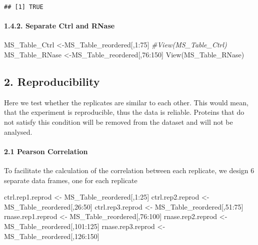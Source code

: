 \documentclass[
]{article}
\newenvironment{Shaded}{\begin{snugshade}}{\end{snugshade}}
\newcommand{\CommentTok}[1]{\textcolor[rgb]{0.56,0.35,0.01}{\textit{#1}}}
\newcommand{\DecValTok}[1]{\textcolor[rgb]{0.00,0.00,0.81}{#1}}
\newcommand{\FunctionTok}[1]{\textcolor[rgb]{0.00,0.00,0.00}{#1}}
\newcommand{\NormalTok}[1]{#1}
\newcommand{\OtherTok}[1]{\textcolor[rgb]{0.56,0.35,0.01}{#1}}
\newcommand{\SpecialCharTok}[1]{\textcolor[rgb]{0.00,0.00,0.00}{#1}}
\begin{document}
\begin{verbatim}
## [1] TRUE
\end{verbatim}

\hypertarget{separate-ctrl-and-rnase}{%
\paragraph{1.4.2. Separate Ctrl and
RNase}\label{separate-ctrl-and-rnase}}

\begin{Shaded}
\begin{Highlighting}[]
\NormalTok{MS\_Table\_Ctrl }\OtherTok{\textless{}{-}}\NormalTok{MS\_Table\_reordered[,}\DecValTok{1}\SpecialCharTok{:}\DecValTok{75}\NormalTok{]}
\CommentTok{\#View(MS\_Table\_Ctrl)}
\NormalTok{MS\_Table\_RNase }\OtherTok{\textless{}{-}}\NormalTok{MS\_Table\_reordered[,}\DecValTok{76}\SpecialCharTok{:}\DecValTok{150}\NormalTok{]}
\FunctionTok{View}\NormalTok{(MS\_Table\_RNase)}
\end{Highlighting}
\end{Shaded}

\hypertarget{reproducibility}{%
\subsection{2. Reproducibility}\label{reproducibility}}

Here we test whether the replicates are similar to each other. This
would mean, that the experiment is reproducible, thus the data is
reliable. Proteins that do not satisfy this condition will be removed
from the dataset and will not be analysed.

\hypertarget{pearson-correlation}{%
\paragraph{2.1 Pearson Correlation}\label{pearson-correlation}}

To facilitate the calculation of the correlation between each replicate,
we design 6 separate data frames, one for each replicate

\begin{Shaded}
\begin{Highlighting}[]
\NormalTok{ctrl.rep1.reprod }\OtherTok{\textless{}{-}}\NormalTok{ MS\_Table\_reordered[,}\DecValTok{1}\SpecialCharTok{:}\DecValTok{25}\NormalTok{]}
\NormalTok{ctrl.rep2.reprod }\OtherTok{\textless{}{-}}\NormalTok{ MS\_Table\_reordered[,}\DecValTok{26}\SpecialCharTok{:}\DecValTok{50}\NormalTok{]}
\NormalTok{ctrl.rep3.reprod }\OtherTok{\textless{}{-}}\NormalTok{ MS\_Table\_reordered[,}\DecValTok{51}\SpecialCharTok{:}\DecValTok{75}\NormalTok{]}
\NormalTok{rnase.rep1.reprod }\OtherTok{\textless{}{-}}\NormalTok{ MS\_Table\_reordered[,}\DecValTok{76}\SpecialCharTok{:}\DecValTok{100}\NormalTok{]}
\NormalTok{rnase.rep2.reprod }\OtherTok{\textless{}{-}}\NormalTok{ MS\_Table\_reordered[,}\DecValTok{101}\SpecialCharTok{:}\DecValTok{125}\NormalTok{]}
\NormalTok{rnase.rep3.reprod }\OtherTok{\textless{}{-}}\NormalTok{ MS\_Table\_reordered[,}\DecValTok{126}\SpecialCharTok{:}\DecValTok{150}\NormalTok{]}
\end{Highlighting}
\end{Shaded}
\end{document}
